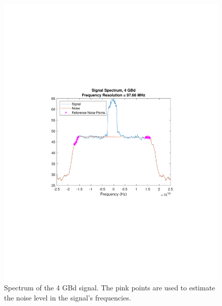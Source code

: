 \begin{refsection}
\begin{figure}[H]
\begin{minipage}{0.43\textwidth}
	\end{minipage}
	\begin{minipage}{0.43\textwidth}
		\centering
		\includegraphics[clip, trim=4cm 8cm 4cm 8cm, 
		width=1\textwidth]{./sdf/m_qam_system/figures/snr/minMaxSpec/4GBdMaxSpecHSNR.pdf}
		\subcaption{\label{fig:snrMaxFreq_4_10_500}}
	\end{minipage}
	\caption{Spectrum of the 4 GBd signal. The pink points are used to 
		estimate the noise level in the signal's 
		frequencies.\label{fig:snrSpec_4_10_500}}
\end{figure}

\begin{figure}[H]
	\centering
	

\end{figure}
\end{refsection}
